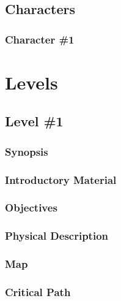 \documentclass[12pt,titlepage]{article}
\begin{document}

\subsection{Characters}

\subsubsection{Character \#1}


\section{Levels}

\subsection{Level \#1}

\subsubsection{Synopsis}

\subsubsection{Introductory Material}

\subsubsection{Objectives}

\subsubsection{Physical Description}

\subsubsection{Map}

\subsubsection{Critical Path}
\end{document}
